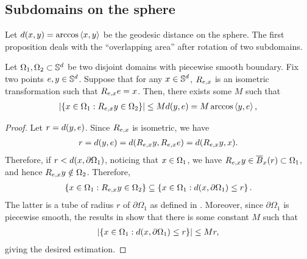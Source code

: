 \subsection{Subdomains on the sphere}

%

Let $d(x,y) = \arccos\left\langle{x,y}\right\rangle$ be the geodesic distance on the sphere.
The first proposition deals with the ``overlapping  area'' after rotation of two subdomains.

\begin{proposition}
  \label{prop:AreaControl}
  Let $\Omega_1, \Omega_2 \subset \mathbb{S}^d$ be two disjoint domains with piecewise smooth boundary.
  Fix two points ${e},y \in \mathbb{S}^d$.
  Suppose that for any $x \in \mathbb{S}^d$, $R_{{e},x}$ is an isometric transformation such that $R_{{e},x} {e} = x$.
  Then, there exists some $M$ such that
  \begin{align}
    \abs{\left\{ x \in \Omega_1 : R_{{e},x} y \in \Omega_2 \right\}} \leq
    M d(y,{e}) = M \arccos \left\langle{y,{e}}\right\rangle,
  \end{align}
\end{proposition}
\begin{proof}
  Let $r = d(y,{e})$.
  Since $R_{{e},x}$ is isometric, we have
  \begin{align*}
    r = d(y,{e}) = d(R_{{e},x}y, R_{{e},x}{e}) = d(R_{{e},x}y,x).
  \end{align*}
  Therefore, if $r < d(x,\partial \Omega_1)$, noticing that $x \in \Omega_1$, we have $R_{{e},x} y \in \overline{B}_{x}(r) \subset \Omega_1$,
  and hence $R_{{e},x}y \notin \Omega_2$.
  Therefore,
  \begin{align*}
    \left\{ x \in \Omega_1 : R_{{e},x} y \in \Omega_2 \right\}
    \subseteq \left\{ x \in \Omega_1 : d(x,\partial \Omega_1) \leq r \right\}.
  \end{align*}
  The latter is a tube of radius $r$ of $\partial \Omega_1$ as defined in \citet{weyl1939_VolumeTubes}.
  Moreover, since $\partial \Omega_1$ is piecewise smooth, the results in \citet{weyl1939_VolumeTubes} show that there is some constant $M$
  such that
  \begin{align*}
    \abs{\left\{ x \in \Omega_1 : d(x,\partial \Omega_1) \leq r \right\}}
    \leq M r,
  \end{align*}
  giving the desired estimation.
\end{proof}



